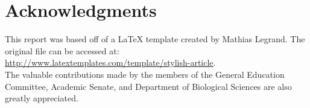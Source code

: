 \documentclass[fleqn,10pt]{SelfArx}\usepackage[]{graphicx}\usepackage[]{color}
\begin{document}
\section*{Acknowledgments} %

This report was based off of a \LaTeX{} template created by Mathias Legrand. The original file can be accessed at: \\
\href{http://www.latextemplates.com/template/stylish-article}{http://www.latextemplates.com/template/stylish-article}. \\
The valuable contributions made by the members of the General Education Committee, Academic Senate, and Department of Biological Sciences are also greatly appreciated.

\printbibliography[title={References},heading=bibintoc]


\end{document}
